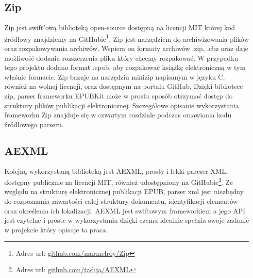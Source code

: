 \subsection{Zip}

Zip jest swift'ową biblioteką open-source dostępną na licencji MIT której kod źródłowy znajdziemy na GitHubie\footnote{Adres url: \href{https://github.com/marmelroy/Zip}{github.com/marmelroy/Zip}}. Zip jest narzędziem do archiwizowania plików oraz rozpakowywania archiwów. Wspiera on formaty archiwów .zip, .cbz oraz daje możliwość dodania rozszerzenia pliku który chcemy rozpakować. W przypadku tego projektu dodano format .epub, aby rozpakować książkę elektroniczną w tym właśnie formacie. Zip bazuje na narzędziu minizip napisanym w języku C, również na wolnej licencji, oraz dostępnym na portalu GitHub. Dzięki bibliotece zip, parser frameworku EPUBKit może w prostu sposób otrzymać dostęp do struktury plików publikacji elektronicznej. Szczegółowe opisanie wykorzystania frameworku Zip znajduje się w czwartym rozdziale podczas omawiania kodu źródłowego parseru.

\subsection{AEXML}

Kolejną wykorzystaną biblioteką jest AEXML, prosty i lekki pareser XML, dostępny publicznie na licencji MIT, również udostępniony na GitHubie\footnote{Adres url: \href{https://github.com/tadija/AEXML}{github.com/tadija/AEXML}}. Ze względu na strukturę elektronicznej publikacji EPUB, parser xml jest niezbędny do rozpoznania zawartości całej struktury dokumentu, identyfikacji elementów oraz określenia ich lokalizacji. AEXML jest swiftowym frameworkiem a jego API jest czytelne i proste w wykorzystaniu dzięki czemu idealnie spełnia swoje zadanie w projekcie który opisuje ta praca.
